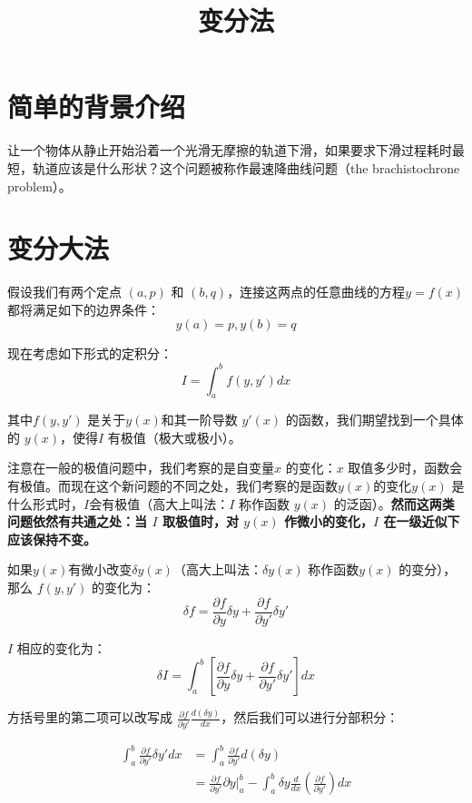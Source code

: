 \documentclass[12pt]{article}
\title{变分法\cite{Talk_About_Variational_Principle}}
\begin{document}
\maketitle

\section{简单的背景介绍}
让一个物体从静止开始沿着一个光滑无摩擦的轨道下滑，如果要求下滑过程耗时最短，轨道应该是什么形状？这个问题被称作最速降曲线问题（the brachistochrone problem）。

\section{变分大法}
假设我们有两个定点 $(a,p)$ 和 $(b,q)$，连接这两点的任意曲线的方程$y=f(x)$ 都将满足如下的边界条件：
\begin{equation}
    y(a) = p, y(b) = q
\end{equation}

现在考虑如下形式的定积分：
\begin{equation}
    I = \int_a^b{f(y,y')dx}
\end{equation}

其中$f(y,y')$ 是关于$y(x)$和其一阶导数 $y'(x)$ 的函数，我们期望找到一个具体的 $y(x)$，使得$I$ 有极值（极大或极小）。

注意在一般的极值问题中，我们考察的是自变量$x$ 的变化：$x$ 取值多少时，函数会有极值。而现在这个新问题的不同之处，我们考察的是函数$y(x)$的变化$y(x)$ 是什么形式时，$I$会有极值（高大上叫法：$I$ 称作函数 $y(x)$ 的泛函）。\textbf{然而这两类问题依然有共通之处：当 $I$ 取极值时，对 $y(x)$ 作微小的变化，$I$ 在一级近似下应该保持不变。}

如果$y(x)$有微小改变$\delta y(x)$（高大上叫法：$\delta y(x)$ 称作函数$y(x)$ 的变分），那么 $f(y,y')$ 的变化为：
\begin{equation}
    \delta f = \frac{\partial f}{\partial y} \delta y + \frac{\partial f}{\partial y'} \delta y'
\end{equation}

$I$ 相应的变化为：
\begin{equation}
    \delta I = \int_a^b[\frac{\partial f}{\partial y} \delta y + \frac{\partial f}{\partial y'} \delta y']dx
\end{equation}

方括号里的第二项可以改写成 $\frac{\partial f}{\partial y'}\frac{d(\delta y)}{dx}$，然后我们可以进行分部积分：

\begin{align}
    \int_a^b{\frac{\partial f}{\partial y'}\delta y'dx} &= \int_a^b\frac{\partial f}{\partial y'}d(\delta y) \\
    &= \frac{\partial f}{\partial y'}\partial y \big|_a^b - \int_a^b{\delta y}\frac{d}{dx}(\frac{\partial f}{\partial y'})dx
\end{align}
\end{document}
